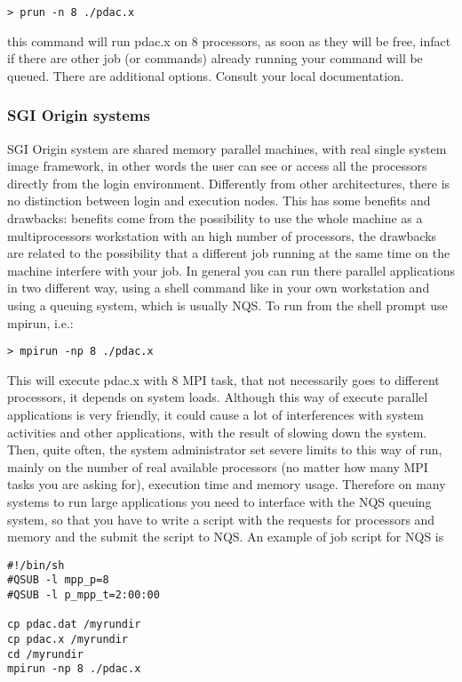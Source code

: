 \begin{verbatim}
> prun -n 8 ./pdac.x
\end{verbatim}

this command will run pdac.x on 8 processors, as soon as they will
be free, infact if there are other job (or commands) already running
your command will be queued.
There are additional options.  Consult your local documentation.

\subsubsection{SGI Origin systems}

SGI Origin system are shared memory parallel machines, with
real single system image framework, in other words the user
can see or access all the processors directly from the 
login environment. Differently from other architectures,
there is no distinction between login and execution nodes.
This has some benefits and drawbacks: benefits come from
the possibility to use the whole machine as a multiprocessors
workstation with an high number of processors, the drawbacks
are related to the possibility that a different job running
at the same time on the machine interfere with your job.
In general you can run there parallel applications 
in two different way, using a shell command like in your own
workstation and using a queuing system, which is usually NQS.
To run from the shell prompt use mpirun, i.e.: 

\begin{verbatim}
> mpirun -np 8 ./pdac.x
\end{verbatim}

This will execute pdac.x with 8 MPI task, that not necessarily
goes to different processors, it depends on system loads.
Although this way of execute parallel applications is very
friendly, it could cause a lot of interferences with system
activities and other applications, with the result of slowing
down the system. Then, quite often, the system administrator
set severe limits to this way of run, mainly on the number of
real available processors (no matter how many MPI tasks you are asking
for), execution time and memory usage.
Therefore on many systems to run large applications you need to 
interface with the NQS queuing system, so that
you have to write a script with the requests for processors and
memory and the submit the script to NQS.
An example of job script for NQS is 

\begin{verbatim}
#!/bin/sh
#QSUB -l mpp_p=8
#QSUB -l p_mpp_t=2:00:00

cp pdac.dat /myrundir
cp pdac.x /myrundir
cd /myrundir
mpirun -np 8 ./pdac.x
\end{verbatim}

